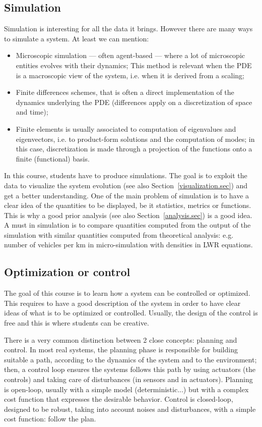 \subsection{Simulation}\label{simulation.sec}
Simulation is interesting for all the data it brings. However there are many ways to simulate a system. At least we can mention:
\begin{itemize}
	\item Microscopic simulation --- often agent-based --- where a lot of microscopic entities evolves with their dynamics; This method is relevant when the PDE is a macroscopic view of the system, i.e. when it is derived from a scaling;
	\item Finite differences schemes, that is often a direct implementation of the dynamics underlying the PDE (differences apply on a discretization of space and time);
	\item Finite elements is usually associated to computation of eigenvalues and eigenvectors, i.e. to product-form solutions and the computation of modes; in this case, discretization is made through a projection of the functions onto a finite (functional) basis.
\end{itemize}
In this course, students have to produce simulations. The goal is to exploit the data to visualize the system evolution (see also Section~\ref{visualization.sec}) and get a better understanding. One of the main problem of simulation is to have a clear idea of the quantities to be displayed, be it statistics, metrics or functions. This is why a good prior analysis (see also Section~\ref{analysis.sec}) is a good idea. A must in simulation is to compare quantities computed from the output of the simulation with similar quantities computed from theoretical analysis: e.g. number of vehicles per km in micro-simulation with densities in LWR equations.


\subsection{Optimization or control}\label{optimization.sec}
The goal of this course is to learn how a system can be controlled or optimized. This requires to have a good description of the system in order to have clear ideas of what is to be optimized or controlled. Usually, the design of the control is free and this is where students can be creative.

There is a very common distinction between 2 close concepts: planning and control. In most real systems, the planning phase is responsible for building suitable a path, according to the dynamics of the system and to the environment; then, a control loop ensures the systems follows this path by using actuators (the controls) and taking care of disturbances (in sensors and in actuators). Planning is open-loop, usually with a simple model (deterministic...) but with a complex cost function that expresses the desirable behavior. Control is closed-loop, designed to be robust, taking into account noises and disturbances, with a simple cost function: follow the plan.

